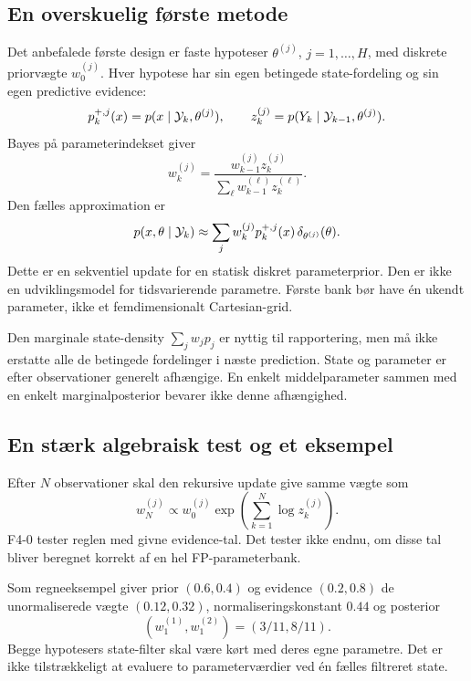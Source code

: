 \subsection{En overskuelig første metode}
Det anbefalede første design er faste hypoteser \(\theta^{(j)}\), \(j=1,\ldots,H\), med diskrete priorvægte \(w_0^{(j)}\). Hver hypotese har sin egen betingede state-fordeling og sin egen predictive evidence:
\[
 p_k^{+,j}(x)=p(x\mid\mathcal Y_k,\theta^{(j)}),\qquad
 z_k^{(j)}=p(Y_k\mid\mathcal Y_{k-1},\theta^{(j)}).
\]
Bayes på parameterindekset giver
\begin{equation}
 \boxed{w_k^{(j)}=\frac{w_{k-1}^{(j)}z_k^{(j)}}
 {\sum_\ell w_{k-1}^{(\ell)}z_k^{(\ell)}}.}
 \label{eq:bank}
\end{equation}
Den fælles approximation er
\begin{equation}
 p(x,\theta\mid\mathcal Y_k)\approx
 \sum_jw_k^{(j)}p_k^{+,j}(x)\,\delta_{\theta^{(j)}}(\theta).
 \label{eq:jointbank}
\end{equation}
Dette er en sekventiel update for en statisk diskret parameterprior. Den er ikke en udviklingsmodel for tidsvarierende parametre. Første bank bør have én ukendt parameter, ikke et femdimensionalt Cartesian-grid.

Den marginale state-density \(\sum_jw_jp_j\) er nyttig til rapportering, men må ikke erstatte alle de betingede fordelinger i næste prediction. State og parameter er efter observationer generelt afhængige. En enkelt middelparameter sammen med en enkelt marginalposterior bevarer ikke denne afhængighed.

\subsection{En stærk algebraisk test og et eksempel}
Efter \(N\) observationer skal den rekursive update give samme vægte som
\begin{equation}
 w_N^{(j)}\propto w_0^{(j)}\exp\!\left(\sum_{k=1}^N\log z_k^{(j)}\right).
 \label{eq:bankreplay}
\end{equation}
F4-0 tester reglen med givne evidence-tal. Det tester ikke endnu, om disse tal bliver beregnet korrekt af en hel FP-parameterbank.

Som regneeksempel giver prior \((0.6,0.4)\) og evidence \((0.2,0.8)\) de unormaliserede vægte \((0.12,0.32)\), normaliseringskonstant \(0.44\) og posterior
\[
 (w_1^{(1)},w_1^{(2)})=(3/11,8/11).
\]
Begge hypotesers state-filter skal være kørt med deres egne parametre. Det er ikke tilstrækkeligt at evaluere to parameterværdier ved én fælles filtreret state.

